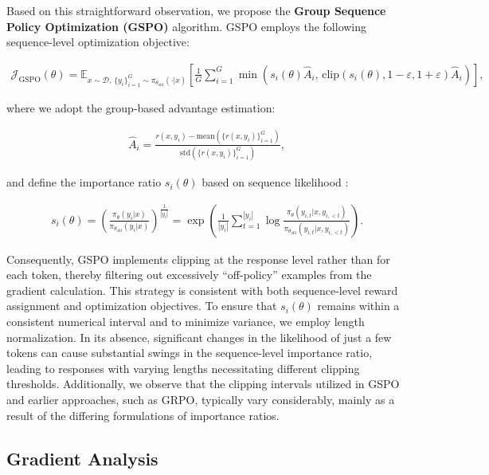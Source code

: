 Based on this straightforward observation, we propose the \textbf{Group Sequence Policy Optimization (GSPO)} algorithm. GSPO employs the following sequence-level optimization objective:

\begin{align}
\mathcal{J}_\text{GSPO} (\theta) =
\mathbb{E}_{ x \sim \mathcal{D},\, \{y_i\}_{i=1}^G \sim \pi_{\theta_\text{old}}( \cdot | x) }
\left[ 
\frac{1}{G} \sum_{i=1}^{G}
\min \left( s_{i}(\theta)  \widehat{A}_{i},  \, \mathrm{clip} \left( s_{i}(\theta), 1 - {\varepsilon}, 1 + {\varepsilon} \right) \widehat{A}_{i} \right) 
\right],
\label{equ:gspo}
\end{align}

where we adopt the group-based advantage estimation:

\begin{align}
\widehat{A}_{i} = \frac{r(x, y_i) - \mathrm{mean} \left( \{ r(x, y_i) \}_{i=1}^G \right) }{ \mathrm{std} \left( \{ r(x, y_i) \}_{i=1}^G \right) },
\end{align}

and define the importance ratio $s_{i}(\theta)$ based on sequence likelihood \citep{click}:

\begin{align}
s_{i}(\theta) = \left( \frac{ \pi_{\theta} (y_i | x) }{ \pi_{\theta_\text{old}} (y_i | x)} \right)^{\frac{1}{|y_i|}}
=
\exp \left( \frac{1}{|y_i|} \sum_{t=1}^{|y_i|} \log \frac{ \pi_{\theta} (y_{i,t} | x, y_{i,<t}) }{ \pi_{\theta_\text{old}} (y_{i,t} | x,y_{i,<t})} \right).
\end{align}

Consequently, GSPO implements clipping at the response level rather than for each token, thereby filtering out excessively ``off-policy'' examples from the gradient calculation. This strategy is consistent with both sequence-level reward assignment and optimization objectives. To ensure that $s_{i}(\theta)$ remains within a consistent numerical interval and to minimize variance, we employ length normalization. In its absence, significant changes in the likelihood of just a few tokens can cause substantial swings in the sequence-level importance ratio, leading to responses with varying lengths necessitating different clipping thresholds. Additionally, we observe that the clipping intervals utilized in GSPO and earlier approaches, such as GRPO, typically vary considerably, mainly as a result of the differing formulations of importance ratios.

\subsection{Gradient Analysis}
\label{subsec:gradient}

